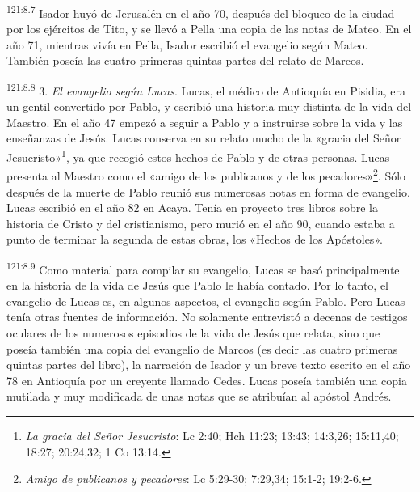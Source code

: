 \par 
\textsuperscript{121:8.7} Isador huyó de Jerusalén en el año 70, después del bloqueo de la ciudad por los ejércitos de Tito, y se llevó a Pella una copia de las notas de Mateo. En el año 71, mientras vivía en Pella, Isador escribió el evangelio según Mateo. También poseía las cuatro primeras quintas partes del relato de Marcos.

\par 
\textsuperscript{121:8.8} 3. \textit{El evangelio según Lucas}. Lucas, el médico de Antioquía en Pisidia, era un gentil convertido por Pablo, y escribió una historia muy distinta de la vida del Maestro. En el año 47 empezó a seguir a Pablo y a instruirse sobre la vida y las enseñanzas de Jesús. Lucas conserva en su relato mucho de la «gracia del Señor Jesucristo»\footnote{\textit{La gracia del Señor Jesucristo}: Lc 2:40; Hch 11:23; 13:43; 14:3,26; 15:11,40; 18:27; 20:24,32; 1 Co 13:14.}, ya que recogió estos hechos de Pablo y de otras personas. Lucas presenta al Maestro como el «amigo de los publicanos y de los pecadores»\footnote{\textit{Amigo de publicanos y pecadores}: Lc 5:29-30; 7:29,34; 15:1-2; 19:2-6.}. Sólo después de la muerte de Pablo reunió sus numerosas notas en forma de evangelio. Lucas escribió en el año 82 en Acaya. Tenía en proyecto tres libros sobre la historia de Cristo y del cristianismo, pero murió en el año 90, cuando estaba a punto de terminar la segunda de estas obras, los «Hechos de los Apóstoles».

\par 
\textsuperscript{121:8.9} Como material para compilar su evangelio, Lucas se basó principalmente en la historia de la vida de Jesús que Pablo le había contado. Por lo tanto, el evangelio de Lucas es, en algunos aspectos, el evangelio según Pablo. Pero Lucas tenía otras fuentes de información. No solamente entrevistó a decenas de testigos oculares de los numerosos episodios de la vida de Jesús que relata, sino que poseía también una copia del evangelio de Marcos (es decir las cuatro primeras quintas partes del libro), la narración de Isador y un breve texto escrito en el año 78 en Antioquía por un creyente llamado Cedes. Lucas poseía también una copia mutilada y muy modificada de unas notas que se atribuían al apóstol Andrés.

